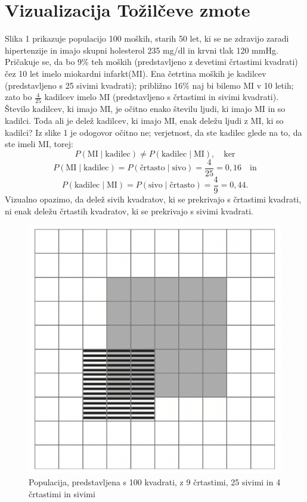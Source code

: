 \documentclass[a4paper,12pt]{article}
\begin{document}
\section{Vizualizacija Tožilčeve zmote}
Slika 1 prikazuje populacijo 100 moških, starih 50 let, ki se ne zdravijo zaradi hipertenzije in imajo skupni holesterol 235 mg/dl in krvni tlak 120 mmHg. Pričakuje
se, da bo 9\% teh moških (predstavljeno z devetimi črtastimi kvadrati) čez 10 let imelo miokardni infarkt(MI). Ena četrtina moških je kadilcev (predstavljeno s 25 
sivimi kvadrati); približno 16\% naj bi bilemo MI v 10 letih; zato bo $\frac{4}{25}$ kadilcev imelo MI (predstavljeno s črtastimi in sivimi kvadrati). \\
Število kadilcev, ki imajo MI, je očitno enako številu ljudi, ki imajo MI in so kadilci. Toda ali je delež kadilcev, ki imajo MI, enak deležu ljudi z MI, ki so kadilci? Iz 
slike 1 je odogovor očitno ne; verjetnost, da ste kadilec glede na to, da ste imeli MI, torej:
\[ P(\text{MI} \mid \text{kadilec}) \ne P(\text{kadilec} \mid \text{MI}), \quad \text{ker}\]
\[ P(\text{MI} \mid \text{kadilec}) = P(\text{črtasto} \mid \text{sivo}) = \frac{4}{25} = 0,16 \quad \text{in}\]
\[P(\text{kadilec} \mid \text{MI}) = P(\text{sivo} \mid \text{črtasto}) = \frac{4}{9} = 0,44.\]
Vizualno opazimo, da delež sivih kvadratov, ki se prekrivajo s črtastimi kvadrati, ni enak deležu črtastih kvadratov, ki se prekrivajo s sivimi kvadrati. 

\begin{figure}[!ht]
    \centering
    \label{fig:slika1}
    \includegraphics[scale=0.60]{slika1.png}
    \caption{Populacija, predstavljena s 100 kvadrati, z 9 črtastimi, 25 sivimi in 4 črtastimi in sivimi}\vspace{2mm}
 \end{figure}
\end{document}

